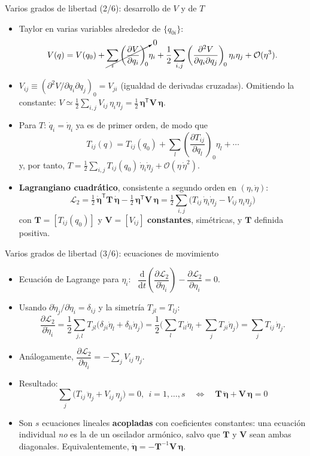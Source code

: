 \documentclass[spanish]{beamer}
\newcommand{\Tm}{\mathbf{T}}              %
\newcommand{\Vm}{\mathbf{V}}              %
\newcommand{\bfeta}{\boldsymbol{\eta}}    %
\newcommand{\dd}{\mathrm{d}}
\begin{document}
\begin{frame}{Varios grados de libertad (2/6): desarrollo de $V$ y de $T$}
\small
\begin{itemize}
\item<1-> Taylor en varias variables alrededor de $\{q_{0i}\}$:
\[
V(q)=V(q_0)+\cancelto{0}{\sum_i\left(\frac{\partial V}{\partial q_i}\right)_{\!0}}\eta_i
+\frac12\sum_{i,j}\left(\frac{\partial^2V}{\partial q_i\partial q_j}\right)_{\!0}\eta_i\eta_j+\mathcal{O}(\eta^3).
\]
\item<2-> $V_{ij}\equiv(\partial^2V/\partial q_i\partial q_j)_0=V_{ji}$ (igualdad de derivadas cruzadas). Omitiendo la constante:
$V\simeq\tfrac12\sum_{i,j}V_{ij}\,\eta_i\eta_j=\tfrac12\,\bfeta^{\mathsf T}\Vm\,\bfeta$.
\item<3-> Para $T$: $\dot q_i=\dot\eta_i$ ya es de primer orden, de modo que
\[
T_{ij}(q)=T_{ij}(q_0)+\sum_l\left(\frac{\partial T_{ij}}{\partial q_l}\right)_{\!0}\eta_l+\cdots
\]
y, por tanto, $T=\tfrac12\sum_{i,j}T_{ij}(q_0)\,\dot\eta_i\dot\eta_j+\mathcal{O}(\eta\,\dot\eta^2)$.
\item<4-> \textbf{Lagrangiano cuadrático}, consistente a segundo orden en $(\eta,\dot\eta)$:
\[
\boxed{\;\mathcal{L}_2=\tfrac12\,\dot{\bfeta}^{\mathsf T}\Tm\,\dot{\bfeta}-\tfrac12\,\bfeta^{\mathsf T}\Vm\,\bfeta
=\tfrac12\sum_{i,j}\big(T_{ij}\,\dot\eta_i\dot\eta_j-V_{ij}\,\eta_i\eta_j\big)\;}
\]
con $\Tm=[T_{ij}(q_0)]$ y $\Vm=[V_{ij}]$ \textbf{constantes}, simétricas, y $\Tm$ definida positiva.
\end{itemize}
\end{frame}

\begin{frame}{Varios grados de libertad (3/6): ecuaciones de movimiento}
\begin{itemize}
\item<1-> Ecuación de Lagrange para $\eta_i$: \ $\dfrac{\dd}{\dd t}\left(\dfrac{\partial\mathcal{L}_2}{\partial\dot\eta_i}\right)-\dfrac{\partial\mathcal{L}_2}{\partial\eta_i}=0$.
\item<2-> Usando $\partial\dot\eta_j/\partial\dot\eta_i=\delta_{ij}$ y la simetría $T_{jl}=T_{lj}$:
\[
\frac{\partial\mathcal{L}_2}{\partial\dot\eta_i}=\frac12\sum_{j,l}T_{jl}\big(\delta_{ji}\dot\eta_l+\delta_{li}\dot\eta_j\big)
=\frac12\Big(\sum_l T_{il}\dot\eta_l+\sum_j T_{ji}\dot\eta_j\Big)=\sum_j T_{ij}\,\dot\eta_j .
\]
\item<3-> Análogamente, $\dfrac{\partial\mathcal{L}_2}{\partial\eta_i}=-\displaystyle\sum_j V_{ij}\,\eta_j$.
\item<4-> Resultado:
\[
\boxed{\;\sum_j\big(T_{ij}\,\ddot\eta_j+V_{ij}\,\eta_j\big)=0,\ \ i=1,\ldots,s
\quad\Longleftrightarrow\quad
\Tm\,\ddot{\bfeta}+\Vm\,\bfeta=0\;}
\]
\item<5-> Son $s$ ecuaciones lineales \textbf{acopladas} con coeficientes constantes: una ecuación individual \emph{no} es la de un oscilador armónico, salvo que $\Tm$ y $\Vm$ sean ambas diagonales. Equivalentemente, $\ddot{\bfeta}=-\Tm^{-1}\Vm\,\bfeta$.
\end{itemize}
\end{frame}
\end{document}
